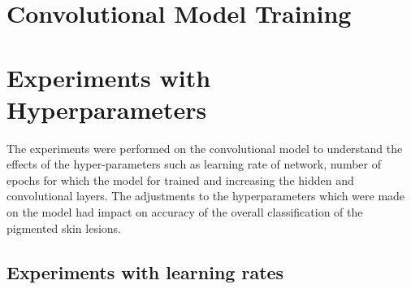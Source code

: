 \section{Convolutional Model Training}

\pagebreak
\section{Experiments with Hyperparameters}
The experiments were performed on the convolutional model to understand the effects of the hyper-parameters 
such as learning rate of network, number of epochs for which the model for trained and increasing the hidden  
and convolutional layers. The adjustments to the hyperparameters which were made on the model had impact on 
accuracy of the overall classification of the pigmented skin lesions.
\subsection*{Experiments with learning rates}
